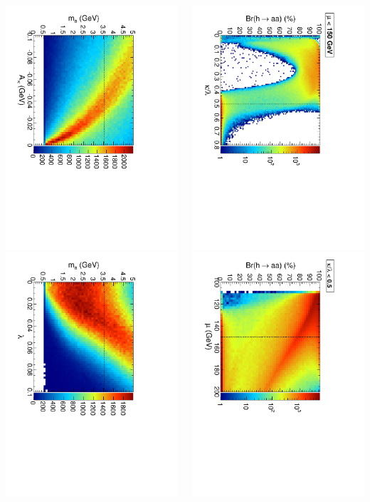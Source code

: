 \documentclass[compress]{beamer}
\begin{document}
\begin{frame}
\begin{columns}
\includegraphics[height=0.5\linewidth, angle=90]{pmass1_Akappa_widescan.pdf}
\includegraphics[height=0.5\linewidth, angle=90]{pmass1_lambda_widescan.pdf}

\includegraphics[height=0.5\linewidth, angle=90]{koverl_widescan.pdf}
\includegraphics[height=0.5\linewidth, angle=90]{mu_widescan.pdf}


\end{columns}
\end{frame}
\end{document}
